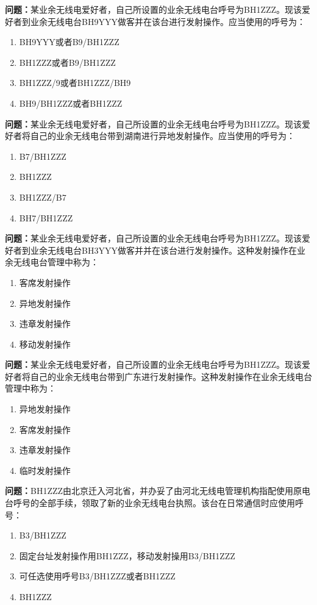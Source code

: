 \documentclass{ctexbook}
\begin{document}
\textbf{问题：}某业余无线电爱好者，自己所设置的业余无线电台呼号为BH1ZZZ。现该爱好者到业余无线电台BH9YYY做客并在该台进行发射操作。应当使用的呼号为：
\begin{enumerate}[label=\Alph*), leftmargin=3em]
\item BH9YYY或者B9/BH1ZZZ
\item BH1ZZZ或者B9/BH1ZZZ
\item BH1ZZZ/9或者BH1ZZZ/BH9
\item BH9/BH1ZZZ或者BH1ZZZ
\end{enumerate}

\textbf{问题：}某业余无线电爱好者，自己所设置的业余无线电台呼号为BH1ZZZ。现该爱好者将自己的业余无线电台带到湖南进行异地发射操作。应当使用的呼号为：
\begin{enumerate}[label=\Alph*), leftmargin=3em]
\item B7/BH1ZZZ
\item BH1ZZZ
\item BH1ZZZ/B7
\item BH7/BH1ZZZ
\end{enumerate}

\textbf{问题：}某业余无线电爱好者，自己所设置的业余无线电台呼号为BH1ZZZ。现该爱好者到业余无线电台BH3YYY做客并并在该台进行发射操作。这种发射操作在业余无线电台管理中称为：
\begin{enumerate}[label=\Alph*), leftmargin=3em]
\item 客席发射操作
\item 异地发射操作
\item 违章发射操作
\item 移动发射操作
\end{enumerate}

\textbf{问题：}某业余无线电爱好者，自己所设置的业余无线电台呼号为BH1ZZZ。现该爱好者将自己的业余无线电台带到广东进行发射操作。这种发射操作在业余无线电台管理中称为：
\begin{enumerate}[label=\Alph*), leftmargin=3em]
\item 异地发射操作
\item 客席发射操作
\item 违章发射操作
\item 临时发射操作
\end{enumerate}

\textbf{问题：}BH1ZZZ由北京迁入河北省，并办妥了由河北无线电管理机构指配使用原电台呼号的全部手续，领取了新的业余无线电台执照。该台在日常通信时应使用呼号：
\begin{enumerate}[label=\Alph*), leftmargin=3em]
\item B3/BH1ZZZ
\item 固定台址发射操作用BH1ZZZ，移动发射操用B3/BH1ZZZ
\item 可任选使用呼号B3/BH1ZZZ或者BH1ZZZ
\item BH1ZZZ
\end{enumerate}
\end{document}
